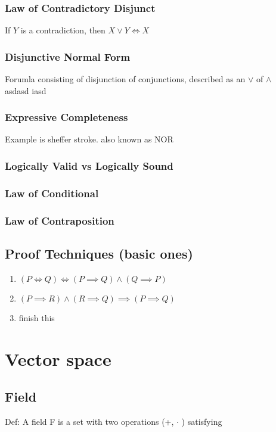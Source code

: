 \documentclass[a4paper]{article}
\begin{document}
\subsubsection{Law of Contradictory Disjunct}
If $Y$ is a contradiction, then $X \lor Y \Leftrightarrow X$

\subsubsection{Disjunctive Normal Form}
Forumla consisting of disjunction of conjunctions, described as an $\lor$ of $\land$\\
asdasd
iasd
\subsubsection{Expressive Completeness}
Example is sheffer stroke.
also known as NOR

\subsubsection{Logically Valid vs Logically Sound}

\subsubsection{Law of Conditional}

\subsubsection{Law of Contraposition}

\subsection{Proof Techniques (basic ones)}

\begin{enumerate}[i]
	\item $(P \Leftrightarrow Q) \Leftrightarrow (P \implies Q) \land (Q \implies P)$ 
	\item $(P \implies R) \land (R \implies Q) \implies (P \implies Q)$
	\item finish this
\end{enumerate}



\section{Vector space}
\subsection{Field}
Def: A field F is a set with two operations (+, $\cdot$ ) satisfying
\end{document}
